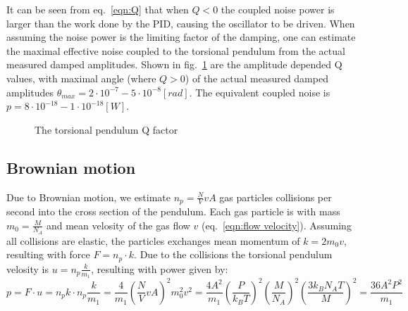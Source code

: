 \documentclass[\main/master.tex]{subfiles}
\begin{document}
It can be seen from eq.~\ref{eqn:Q} that when $Q<0$ the coupled noise power is larger than the work done by the PID, causing the oscillator to be driven. When assuming the noise power is the limiting factor of the damping, one can estimate the maximal effective noise coupled to the torsional pendulum from the actual measured damped amplitudes. Shown in fig.~\ref{fig:Q factor} are the amplitude depended Q values, with maximal angle (where $Q>0$) of the actual measured damped amplitudes $\theta_{max}= 2\cdot 10^{-7} - 5\cdot 10^{-8} [rad]$. The equivalent coupled noise is  $p= 8\cdot 10^{-18} - 1\cdot 10^{-18} [W]$.

\begin{figure}[htbp]
	\centering
	\caption[The torsional pendulum Q factor]{The torsional pendulum Q factor}
	\label{fig:Q factor}
\end{figure} 

\subsection{Brownian motion}
Due to Brownian motion, we estimate $n_p= \frac{N}{V}v A$ gas particles collisions per second into the cross section of the pendulum. Each gas particle is with mass $m_0 = \frac{M}{N_A}$ and mean velosity of the gas flow $v$ (eq.~\ref{eqn:flow velocity}). Assuming all collisions are elastic, the particles exchanges mean momentum of $k=2m_0v$, resulting with force $F = n_p\cdot k$. Due to the collisions the torsional pendulum velosity is $ u = n_p\frac{k}{m_1}$, resulting with power given by:
\begin{equation}
p = F\cdot u =  n_p k \cdot n_p\frac{k}{m_1} =\frac{4}{m_1}(\frac{N}{V}v A)^2m_0^2v^2=\frac{4A^2}{m_1}(\frac{P}{k_B T})^2(\frac{M}{N_A})^2 (\frac{3 k_B N_A T}{M})^2 =\frac{36A^2P^2}{m_1} 
\label{eqn:Brownian power}
\end{equation}
\end{document}
